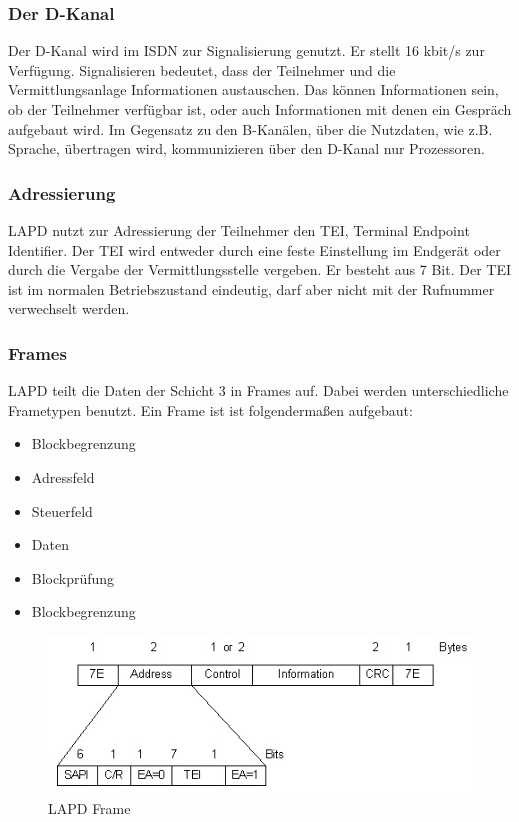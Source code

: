 \documentclass[12pt, a4paper, ngerman]{article}
\begin{document}
\subsubsection{Der D-Kanal}
Der D-Kanal wird im ISDN zur Signalisierung genutzt. Er stellt 16 kbit/s zur Verfügung. Signalisieren bedeutet, dass der Teilnehmer und die Vermittlungsanlage Informationen austauschen. Das können Informationen sein, ob der Teilnehmer verfügbar ist, oder auch Informationen mit denen ein Gespräch aufgebaut wird. Im Gegensatz zu den B-Kanälen, über die Nutzdaten, wie z.B. Sprache, übertragen wird, kommunizieren über den D-Kanal nur Prozessoren.

\subsubsection{Adressierung \label{tei}}
LAPD nutzt zur Adressierung der Teilnehmer den TEI, Terminal Endpoint Identifier. Der TEI wird entweder durch eine feste Einstellung im Endgerät oder durch die Vergabe der Vermittlungsstelle vergeben. Er besteht aus 7 Bit. Der TEI ist im normalen Betriebszustand eindeutig, darf aber nicht mit der Rufnummer verwechselt werden.

\subsubsection{Frames}
LAPD teilt die Daten der Schicht 3 in Frames auf. Dabei werden unterschiedliche Frametypen benutzt. Ein Frame ist ist folgendermaßen aufgebaut:

\begin{itemize}
	\item Blockbegrenzung
	\item Adressfeld
	\item Steuerfeld
	\item Daten
	\item Blockprüfung
	\item Blockbegrenzung
\end{itemize}

\begin{figure}[H]
	\centering
	\includegraphics[width=0.9\linewidth]{Grafiken/lapd_frame.jpg}
	\caption{LAPD Frame \cite{lapd_rahmen}}
	\label{lapd_frame}
\end{figure}
\end{document}
